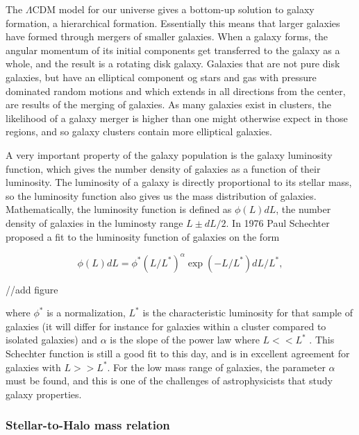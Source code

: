 The $\Lambda$CDM model for our universe gives a bottom-up solution to galaxy formation, a hierarchical formation. Essentially this means that larger galaxies have formed through mergers of smaller galaxies. When a galaxy forms, the angular momentum of its initial components get transferred to the galaxy as a whole, and the result is a rotating disk galaxy. Galaxies that are not pure disk galaxies, but have an elliptical component og stars and gas with pressure dominated random motions and which extends in all directions from the center, are results of the merging of galaxies. As many galaxies exist in clusters, the likelihood of a galaxy merger is higher than one might otherwise expect in those regions, and so galaxy clusters contain more elliptical galaxies.

A very important property of the galaxy population is the galaxy luminosity function, which gives the number density of galaxies as a function of their luminosity. The luminosity of a galaxy is directly proportional to its stellar mass, so the luminosity function also gives us the mass distribution of galaxies. Mathematically, the luminosity function is defined as $\phi(L)dL$, the number density of galaxies in the luminosty range $L \pm dL/2$. In 1976 Paul Schechter proposed a fit to the luminosity function of galaxies on the form

\begin{equation}
    \phi(L)dL = \phi^*(L/L^*)^{\alpha}\exp{(-L/L^*)}dL/L^*,
\end{equation}

//add figure

where $\phi^*$ is a normalization, $L^*$ is the characteristic luminosity for that sample of galaxies (it will differ for instance for galaxies within a cluster compared to isolated galaxies) and $\alpha$ is the slope of the power law where $L<<L^*$ \parencite{Schechter1976}. This Schechter function is still a good fit to this day, and is in excellent agreement for galaxies with $L>>L^*$. For the low mass range of galaxies, the parameter $\alpha$ must be found, and this is one of the challenges of astrophysicists that study galaxy properties.


\subsubsection{Stellar-to-Halo mass relation}

